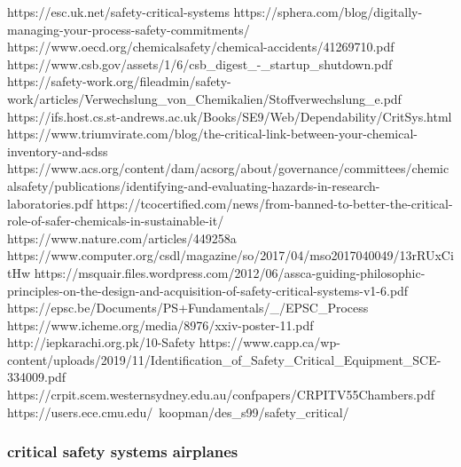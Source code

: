 https://esc.uk.net/safety-critical-systems
https://sphera.com/blog/digitally-managing-your-process-safety-commitments/
https://www.oecd.org/chemicalsafety/chemical-accidents/41269710.pdf
https://www.csb.gov/assets/1/6/csb_digest_-_startup_shutdown.pdf
https://safety-work.org/fileadmin/safety-work/articles/Verwechslung_von_Chemikalien/Stoffverwechslung_e.pdf
https://ifs.host.cs.st-andrews.ac.uk/Books/SE9/Web/Dependability/CritSys.html
https://www.triumvirate.com/blog/the-critical-link-between-your-chemical-inventory-and-sdss
https://www.acs.org/content/dam/acsorg/about/governance/committees/chemicalsafety/publications/identifying-and-evaluating-hazards-in-research-laboratories.pdf
https://tcocertified.com/news/from-banned-to-better-the-critical-role-of-safer-chemicals-in-sustainable-it/
https://www.nature.com/articles/449258a
https://www.computer.org/csdl/magazine/so/2017/04/mso2017040049/13rRUxCitHw
https://msquair.files.wordpress.com/2012/06/assca-guiding-philosophic-principles-on-the-design-and-acquisition-of-safety-critical-systems-v1-6.pdf
https://epsc.be/Documents/PS+Fundamentals/_/EPSC_Process%
https://www.icheme.org/media/8976/xxiv-poster-11.pdf
http://iepkarachi.org.pk/10-Safety%
https://www.capp.ca/wp-content/uploads/2019/11/Identification_of_Safety_Critical_Equipment_SCE-334009.pdf
https://crpit.scem.westernsydney.edu.au/confpapers/CRPITV55Chambers.pdf
https://users.ece.cmu.edu/~koopman/des_s99/safety_critical/



\subsubsection{critical safety systems airplanes}


